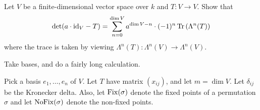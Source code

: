 


\begin{problem}
	\yod
	Let $V$ be a finite-dimensional vector space over $k$ and $T \colon V \to V$.
	Show that
	\[
		\det(a \cdot \mathrm{id}_V - T) =
		\sum_{n=0}^{\dim V} a^{\dim V-n} \cdot (-1)^n
		\operatorname{Tr}\left( \Lambda^n(T) \right)
	\]
	where the trace is taken by viewing $\Lambda^n(T) \colon \Lambda^n(V) \to \Lambda^n(V)$.
	\begin{hint}
		Take bases, and do a fairly long calculation.
	\end{hint}
	\begin{sol}
		\newcommand{\Fix}{\opname{Fix}}
		\newcommand{\NoFix}{\opname{NoFix}}
		Pick a basis $e_1, \dots, e_n$ of $V$.
		Let $T$ have matrix $(x_{ij})$, and let $m = \dim V$.
		Let $\delta_{ij}$ be the Kronecker delta.
		Also, let $\Fix(\sigma)$ denote the fixed points of a permutation $\sigma$
		and let $\NoFix(\sigma)$ denote the non-fixed points.


\end{sol}
\end{problem}

